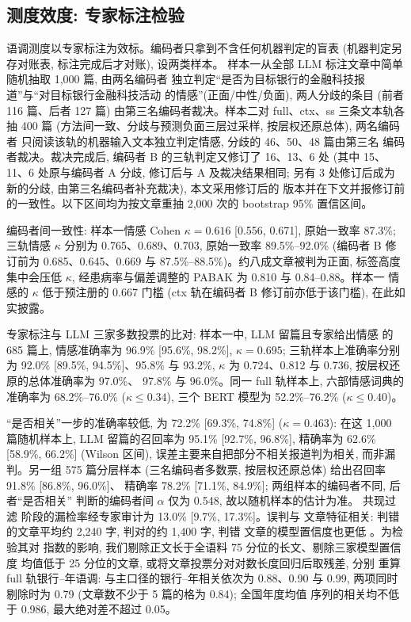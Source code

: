 
\subsection{测度效度: 专家标注检验}\label{sec:validity}
语调测度以专家标注为效标。编码者只拿到不含任何机器判定的盲表
(机器判定另存对账表, 标注完成后才对账), 设两类样本。
样本一从全部 LLM 标注文章中简单随机抽取 1{,}000 篇, 由两名编码者
独立判定``是否为目标银行的金融科技报道''与``对目标银行金融科技活动
的情感''(正面/中性/负面), 两人分歧的条目 (前者 116 篇、后者 127 篇)
由第三名编码者裁决。样本二对 full、ctx、ss 三条文本轨各抽 400 篇
(方法间一致、分歧与预测负面三层过采样, 按层权还原总体), 两名编码者
只阅读该轨的机器输入文本独立判定情感, 分歧的 46、50、48 篇由第三名
编码者裁决。裁决完成后, 编码者 B 的三轨判定又修订了 16、13、6 处
(其中 15、11、6 处原与编码者 A 分歧, 修订后与 A 及裁决结果相同; 另有
3 处修订后成为新的分歧, 由第三名编码者补充裁决), 本文采用修订后的
版本并在下文并报修订前的一致性。以下区间均为按文章重抽 2{,}000 次的 bootstrap 95\% 置信区间。

编码者间一致性: 样本一情感 Cohen $\kappa = 0.616$ [0.556, 0.671],
原始一致率 87.3\%; 三轨情感 $\kappa$ 分别为 0.765、0.689、0.703,
原始一致率 89.5\%--92.0\% (编码者 B 修订前为 0.685、0.645、0.669 与
87.5\%--88.5\%)。约八成文章被判为正面, 标签高度集中会压低
$\kappa$, 经患病率与偏差调整的 PABAK 为 0.810 与 0.84--0.88。样本一
情感的 $\kappa$ 低于预注册的 0.667 门槛 (ctx 轨在编码者 B 修订前亦低于该门槛),
在此如实披露。

专家标注与 LLM 三家多数投票的比对: 样本一中, LLM 留篇且专家给出情感
的 685 篇上, 情感准确率为 96.9\% [95.6\%, 98.2\%], $\kappa = 0.695$;
三轨样本上准确率分别为 92.0\% [89.5\%, 94.5\%]、95.8\% 与 93.2\%,
$\kappa$ 为 0.724、0.812 与 0.736, 按层权还原的总体准确率为 97.0\%、
97.8\% 与 96.0\%。同一 full 轨样本上, 六部情感词典的准确率为
68.2\%--76.0\% ($\kappa \le 0.34$), 三个 BERT 模型为 52.2\%--76.2\%
($\kappa \le 0.40$)。

``是否相关''一步的准确率较低, 为 72.2\% [69.3\%, 74.8\%]
($\kappa = 0.463$): 在这 1{,}000 篇随机样本上, LLM 留篇的召回率为
95.1\% [92.7\%, 96.8\%], 精确率为 62.6\% [58.9\%, 66.2\%] (Wilson 区间),
误差主要来自把部分不相关报道判为相关, 而非漏判。另一组 575 篇分层样本
(三名编码者多数票, 按层权还原总体) 给出召回率 91.8\% [86.8\%, 96.0\%]、
精确率 78.2\% [71.1\%, 84.9\%]; 两组样本的编码者不同, 后者``是否相关''
判断的编码者间 $\alpha$ 仅为 0.548, 故以随机样本的估计为准。 共现过滤
阶段的漏检率经专家审计为 13.0\% [9.7\%, 17.3\%]。误判与
文章特征相关: 判错的文章平均约 2{,}240 字, 判对的约 1{,}400 字, 判错
文章的模型置信度也更低 \parencite{carlson2026llmannotation}。为检验其对
指数的影响, 我们剔除正文长于全语料 75 分位的长文、剔除三家模型置信度
均值低于 25 分位的文章, 或将文章投票分对对数长度回归后取残差, 分别
重算 full 轨银行--年语调: 与主口径的银行--年相关依次为 0.88、0.90 与 0.99,
两项同时剔除时为 0.79 (文章数不少于 5 篇的格为 0.84); 全国年度均值
序列的相关均不低于 0.986, 最大绝对差不超过 0.05。

